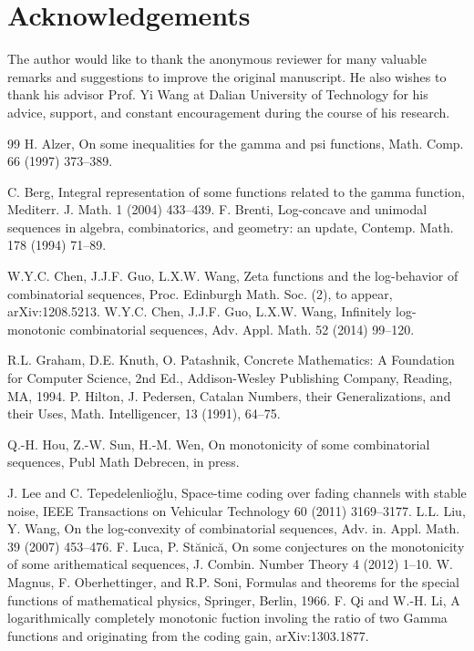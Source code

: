 \documentclass[12pt,reqno]{article}
\theoremstyle{definition}
\numberwithin{equation}{section}
\begin{document}
\section{Acknowledgements}
The author would like to thank the anonymous reviewer for many
valuable remarks and suggestions to improve the original manuscript.
He also wishes to thank his advisor Prof. Yi Wang at Dalian
University of Technology for his advice, support, and constant
encouragement during the course of his research.


\small
\begin{thebibliography}{99}
H. Alzer, On some inequalities for the gamma and psi functions,
Math. Comp. 66 (1997) 373--389.

C. Berg, Integral representation of some functions related to the
gamma function, Mediterr. J. Math. 1 (2004) 433--439.
F. Brenti, Log-concave and unimodal sequences in algebra,
combinatorics, and geometry: an update, Contemp. Math. 178 (1994)
71--89.

W.Y.C. Chen, J.J.F. Guo, L.X.W. Wang, Zeta functions and the
log-behavior of combinatorial sequences, Proc. Edinburgh Math. Soc.
(2), to appear, arXiv:1208.5213.
W.Y.C. Chen, J.J.F. Guo, L.X.W. Wang, Infinitely log-monotonic
combinatorial sequences, Adv. Appl. Math. 52 (2014) 99--120.

R.L. Graham, D.E. Knuth, O. Patashnik, Concrete Mathematics: A
Foundation for Computer Science, 2nd Ed., Addison-Wesley Publishing
Company, Reading, MA, 1994.
P. Hilton, J. Pedersen, Catalan Numbers, their Generalizations, and
their Uses, Math. Intelligencer, 13 (1991), 64--75.

Q.-H. Hou, Z.-W. Sun, H.-M. Wen, On monotonicity of some
combinatorial sequences, Publ Math Debrecen, in press.


J. Lee and C. Tepedelenlio\v{g}lu, Space-time coding over fading
channels with stable noise, IEEE Transactions on Vehicular
Technology 60 (2011) 3169--3177.
L.L. Liu, Y. Wang, On the log-convexity of combinatorial sequences,
Adv. in. Appl. Math. 39 (2007) 453--476.
F. Luca, P. St\u{a}nic\u{a}, On some conjectures on the monotonicity
of some arithematical sequences, J. Combin. Number Theory 4 (2012)
1--10.
W. Magnus, F. Oberhettinger, and R.P. Soni, Formulas and theorems
for the special functions of mathematical physics, Springer, Berlin,
1966.
F. Qi and W.-H. Li, A logarithmically completely monotonic fuction
involing the ratio of two Gamma functions and originating from the
coding gain, arXiv:1303.1877.



\end{thebibliography}
\end{document}
